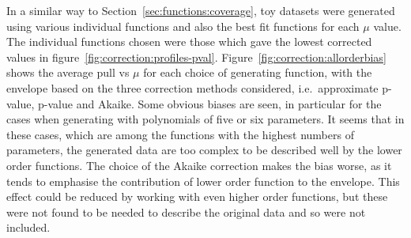 In a similar way to Section~\ref{sec:functions:coverage}, toy datasets
were generated using various individual functions and also the best fit
functions for each $\mu$ value. The individual functions chosen were those
which gave the lowest corrected \nll values in
figure~\ref{fig:correction:profiles-pval}.
Figure~\ref{fig:correction:allorderbias} shows the average pull vs $\mu$
for each choice of generating function, with the envelope based on the
three correction methods considered, i.e.~approximate p-value, p-value 
and Akaike. 
Some obvious biases are seen, in particular for the cases when
generating with polynomials of five or six parameters. It seems that in these
cases, which are among the functions with the highest numbers of parameters,
the generated data are too complex to be described well by the lower order
functions. The choice of the Akaike correction makes the bias worse, as it
tends to emphasise the contribution of lower order function to the envelope.
This effect could be reduced by working with even higher order functions, but
these were not found to be needed to describe the original data and so were
not included.

